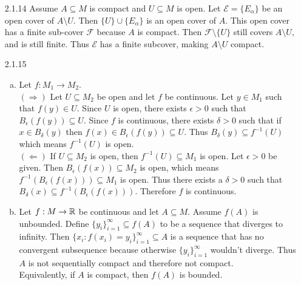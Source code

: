 \documentclass[../../Solutions.tex]{subfiles}
\begin{document}
\begin{itemize}
	\item [2.1.14] Assume $A \subseteq M$ is compact and $U \subseteq M$ is open.
		Let $\mathcal{E} = \{E_\alpha\}$ be an open cover of $A \setminus U$.
		Then $\{U\} \cup \{E_\alpha\}$ is an open cover of $A$.
		This open cover has a finite sub-cover $\mathcal{F}$ because $A$ is compact.
		Then $\mathcal{F} \setminus \{U\}$ still covers $A \setminus U$, and is still finite.
		Thus $\mathcal{E}$ has a finite subcover, making $A \setminus U$ compact.
		
	\item [2.1.15]
	\begin{enumerate}[(a)]
		\item Let $f:M_1 \to M_2$. \\
			$(\Rightarrow)$ Let $U \subseteq M_2$ be open and let $f$ be continuous.
			Let $y \in M_1$ such that $f(y) \in U$.
			Since $U$ is open, there exists $\epsilon > 0$ such that $B_\epsilon(f(y)) \subseteq U$.
			Since $f$ is continuous, there exists $\delta > 0$ such that if $x \in B_\delta(y)$ then $f(x) \in B_\epsilon(f(y)) \subseteq U$.
			Thus $B_\delta(y) \subseteq f^{-1}(U)$ which means $f^{-1}(U)$ is open. \\
			$(\Leftarrow)$ If $U \subseteq M_2$ is open, then $f^{-1}(U) \subseteq M_1$ is open.
			Let $\epsilon > 0$ be given.
			Then $B_\epsilon(f(x)) \subseteq M_2$ is open, which means $f^{-1}(B_\epsilon(f(x))) \subseteq M_1$ is open.
			Thus there exists a $\delta > 0$ such that $B_\delta(x) \subseteq f^{-1}(B_\epsilon(f(x)))$.
			Therefore $f$ is continuous.
		\item Let $f:M \to \mathbb{R}$ be continuous and let $A \subseteq M$.
			Assume $f(A)$ is unbounded.
			Define $\{y_i\}_{i=1}^\infty \subseteq f(A)$ to be a sequence that diverges to infinity.
			Then $\{x_i:f(x_i) = y_i\}_{i=1}^\infty \subseteq A$ is a sequence that has no convergent subsequence because otherwise $\{y_i\}_{i=1}^\infty$ wouldn't diverge.
			Thus $A$ is not sequentially compact and therefore not compact. \\
			Equivalently, if $A$ is compact, then $f(A)$ is bounded.
	\end{enumerate}
	

\end{itemize}
\end{document}
